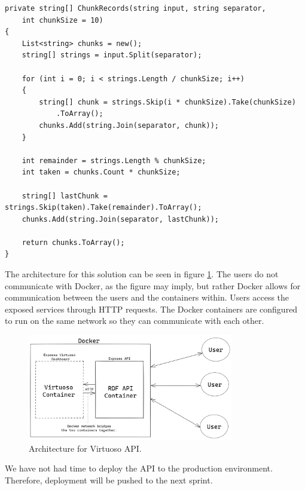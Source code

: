 \begin{lstlisting}[language=CSharp, caption={Chunking logic for large queries.}, label={lst:virtuoso_chunking}]
private string[] ChunkRecords(string input, string separator, 
    int chunkSize = 10)
{
    List<string> chunks = new();
    string[] strings = input.Split(separator);
    
    for (int i = 0; i < strings.Length / chunkSize; i++)
    {
        string[] chunk = strings.Skip(i * chunkSize).Take(chunkSize)
            .ToArray();
        chunks.Add(string.Join(separator, chunk));
    }

    int remainder = strings.Length % chunkSize;
    int taken = chunks.Count * chunkSize;

    string[] lastChunk = strings.Skip(taken).Take(remainder).ToArray();
    chunks.Add(string.Join(separator, lastChunk));
    
    return chunks.ToArray();
}
\end{lstlisting}


The architecture for this solution can be seen in figure \ref{fig:virtuoso_architecture}. The users do not communicate with Docker, as the figure may imply, but rather Docker allows for communication between the users and the containers within. Users access the exposed services through HTTP requests. The Docker containers are configured to run on the same network so they can communicate with each other.

\begin{figure}[h!]
\centering
\includegraphics[width=0.8\textwidth]{Images/Virtuoso_Architecture.png}
\caption{Architecture for Virtuoso API.}
\label{fig:virtuoso_architecture}
\end{figure}

We have not had time to deploy the API to the production environment. Therefore, deployment will be pushed to the next sprint.